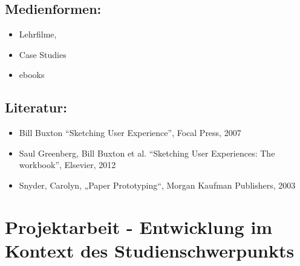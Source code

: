 \section*{Medienformen:\label{/mi-2017/modulbeschreibungen-master/MA_HCI_Sketching_and_Designing_for_User_Experience}}\label{medienformenpathlabelmi-2017modulbeschreibungen-mastermaux5fhciux5fsketchingux5fandux5fdesigningux5fforux5fuserux5fexperience}

\begin{itemize}
\tightlist
\item
  Lehrfilme,
\item
  Case Studies
\item
  ebooks
\end{itemize}

\section*{Literatur:\label{/mi-2017/modulbeschreibungen-master/MA_HCI_Sketching_and_Designing_for_User_Experience}}\label{literaturpathlabelmi-2017modulbeschreibungen-mastermaux5fhciux5fsketchingux5fandux5fdesigningux5fforux5fuserux5fexperience}

\begin{itemize}
\tightlist
\item
  Bill Buxton ``Sketching User Experience'', Focal Press, 2007
\item
  Saul Greenberg, Bill Buxton et al. ``Sketching User Experiences: The
  workbook'', Elsevier, 2012
\item
  Snyder, Carolyn, „Paper Prototyping``, Morgan Kaufman Publishers, 2003
\end{itemize}

\chapter{Projektarbeit - Entwicklung im Kontext des
Studienschwerpunkts\label{/mi-2017/modulbeschreibungen-master/MA_Modul_Projekt_Entwicklung}}\label{projektarbeit---entwicklung-im-kontext-des-studienschwerpunktspathlabelmi-2017modulbeschreibungen-mastermaux5fmodulux5fprojektux5fentwicklung}

